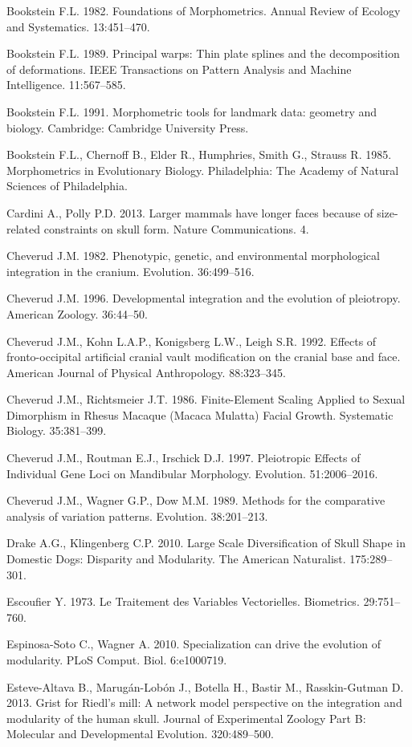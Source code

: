 \documentclass[12pt,]{article}
\begin{document}
Bookstein F.L. 1982. Foundations of Morphometrics. Annual Review of
Ecology and Systematics. 13:451--470.

Bookstein F.L. 1989. Principal warps: Thin plate splines and the
decomposition of deformations. IEEE Transactions on Pattern Analysis and
Machine Intelligence. 11:567--585.

Bookstein F.L. 1991. Morphometric tools for landmark data: geometry and
biology. Cambridge: Cambridge University Press.

Bookstein F.L., Chernoff B., Elder R., Humphries, Smith G., Strauss R.
1985. Morphometrics in Evolutionary Biology. Philadelphia: The Academy
of Natural Sciences of Philadelphia.

Cardini A., Polly P.D. 2013. Larger mammals have longer faces because of
size-related constraints on skull form. Nature Communications. 4.

Cheverud J.M. 1982. Phenotypic, genetic, and environmental morphological
integration in the cranium. Evolution. 36:499--516.

Cheverud J.M. 1996. Developmental integration and the evolution of
pleiotropy. American Zoology. 36:44--50.

Cheverud J.M., Kohn L.A.P., Konigsberg L.W., Leigh S.R. 1992. Effects of
fronto-occipital artificial cranial vault modification on the cranial
base and face. American Journal of Physical Anthropology. 88:323--345.

Cheverud J.M., Richtsmeier J.T. 1986. Finite-Element Scaling Applied to
Sexual Dimorphism in Rhesus Macaque (Macaca Mulatta) Facial Growth.
Systematic Biology. 35:381--399.

Cheverud J.M., Routman E.J., Irschick D.J. 1997. Pleiotropic Effects of
Individual Gene Loci on Mandibular Morphology. Evolution. 51:2006--2016.

Cheverud J.M., Wagner G.P., Dow M.M. 1989. Methods for the comparative
analysis of variation patterns. Evolution. 38:201--213.

Drake A.G., Klingenberg C.P. 2010. Large Scale Diversification of Skull
Shape in Domestic Dogs: Disparity and Modularity. The American
Naturalist. 175:289--301.

Escoufier Y. 1973. Le Traitement des Variables Vectorielles. Biometrics.
29:751--760.

Espinosa-Soto C., Wagner A. 2010. Specialization can drive the evolution
of modularity. PLoS Comput. Biol. 6:e1000719.

Esteve-Altava B., Marugán-Lobón J., Botella H., Bastir M.,
Rasskin-Gutman D. 2013. Grist for Riedl's mill: A network model
perspective on the integration and modularity of the human skull.
Journal of Experimental Zoology Part B: Molecular and Developmental
Evolution. 320:489--500.
\end{document}
